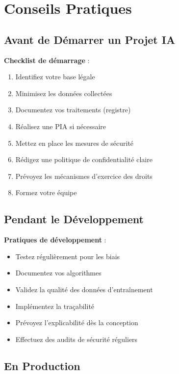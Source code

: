 \documentclass[11pt,a4paper]{article}
\begin{document}
\section{Conseils Pratiques}

\subsection{Avant de Démarrer un Projet IA}

\begin{tipbox}
\textbf{Checklist de démarrage} :
\begin{enumerate}
    \item Identifiez votre base légale
    \item Minimisez les données collectées
    \item Documentez vos traitements (registre)
    \item Réalisez une PIA si nécessaire
    \item Mettez en place les mesures de sécurité
    \item Rédigez une politique de confidentialité claire
    \item Prévoyez les mécanismes d'exercice des droits
    \item Formez votre équipe
\end{enumerate}
\end{tipbox}

\subsection{Pendant le Développement}

\begin{tipbox}
\textbf{Pratiques de développement} :
\begin{itemize}
    \item Testez régulièrement pour les biais
    \item Documentez vos algorithmes
    \item Validez la qualité des données d'entraînement
    \item Implémentez la traçabilité
    \item Prévoyez l'explicabilité dès la conception
    \item Effectuez des audits de sécurité réguliers
\end{itemize}
\end{tipbox}

\subsection{En Production}
\end{document}
